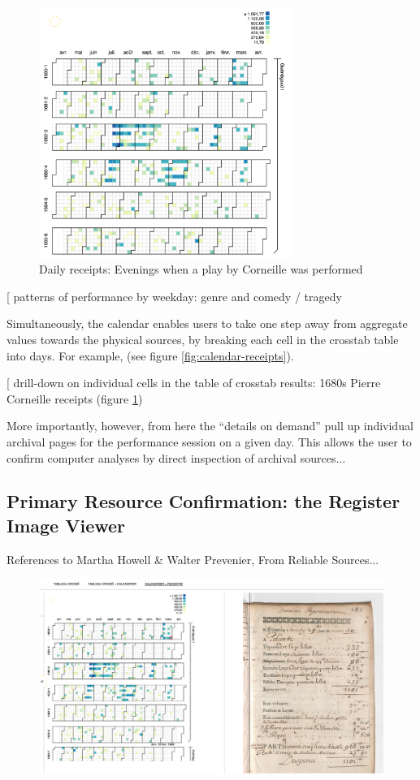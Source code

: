 \documentclass[	DIV=calc,%
							paper=a4,%
							fontsize=11pt,%
							twocolumn]{scrartcl}	 					%
\begin{document}
\begin{figure}
  \centering
	\includegraphics[width=3.25in]{steps/corneille-1680s-receipts.png}
	\caption{Daily receipts: Evenings when a play by Corneille was performed}
	\label{fig:corneille-1680s-receipts}
\end{figure}

[ patterns of performance by weekday: genre and comedy / tragedy

Simultaneously, the calendar enables users to take one step away from aggregate values towards the physical sources, by breaking each cell in the crosstab table into days.  For example, (see figure \ref{fig:calendar-receipts}).

[ drill-down on individual cells in the table of crosstab results: 1680s Pierre Corneille receipts (figure \ref{fig:corneille-1680s-receipts})

More importantly, however, from here the ``details on demand'' pull up individual archival pages for the performance session on a given day.  This allows the user to confirm computer analyses by direct inspection of archival sources...

\subsection*{Primary Resource Confirmation: the Register Image Viewer}

References to Martha Howell \& Walter Prevenier, From Reliable Sources...

\begin{figure}
  \centering
	\includegraphics[width=7in]{steps/register-image-corneille.png}
	\caption{}
	\label{fig:register-image-corneille}
\end{figure}
\end{document}
